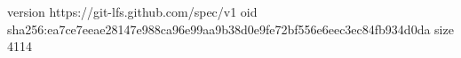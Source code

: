 version https://git-lfs.github.com/spec/v1
oid sha256:ea7ce7eeae28147e988ca96e99aa9b38d0e9fe72bf556e6eec3ec84fb934d0da
size 4114
